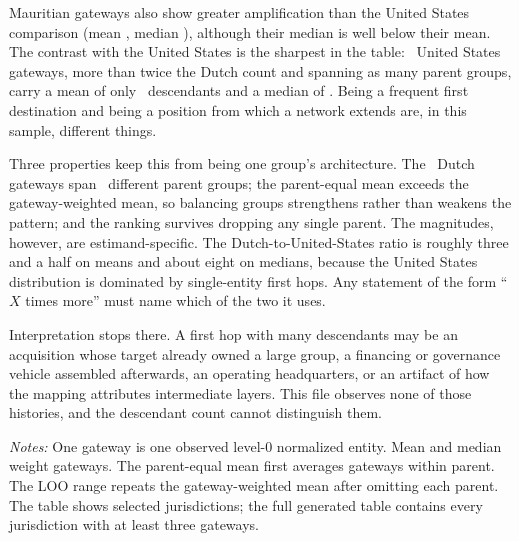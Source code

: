 \documentclass[11pt]{article}
\begin{document}
Mauritian gateways also show greater amplification than the United States
comparison (mean \MauritiusGatewayMean, median \MauritiusGatewayMedian),
although their median is well below their mean. The contrast with the United
States is the sharpest in the table: \UsGateways\ United States gateways, more
than twice the Dutch count and spanning as many parent groups, carry a mean of
only \DutchGatewayUsMean\ descendants and a median of \UsGatewayMedian. Being a
frequent first destination and being a position from which a network extends
are, in this sample, different things.

Three properties keep this from being one group's architecture. The
\DutchGateways\ Dutch gateways span \DutchGatewayParents\ different parent
groups; the parent-equal mean exceeds the gateway-weighted mean, so balancing
groups strengthens rather than weakens the pattern; and the ranking survives
dropping any single parent. The magnitudes, however, are estimand-specific. The
Dutch-to-United-States ratio is roughly three and a half on means and about
eight on medians, because the United States distribution is dominated by
single-entity first hops. Any statement of the form ``$X$ times more'' must name
which of the two it uses.

Interpretation stops there. A first hop with many descendants may be an
acquisition whose target already owned a large group, a financing or governance
vehicle assembled afterwards, an operating headquarters, or an artifact of how
the mapping attributes intermediate layers. This file observes none of those
histories, and the descendant count cannot distinguish them.

\begin{table}[tbp]
\centering
\caption{Downstream amplification by selected first-hop jurisdiction}
\label{tab:gateways}
\scriptsize
\resizebox{\textwidth}{!}{}
\begin{minipage}{0.97\textwidth}
\footnotesize\vspace{0.4em}
\textit{Notes:} One gateway is one observed level-0 normalized entity. Mean
and median weight gateways. The parent-equal mean first averages gateways
within parent. The LOO range repeats the gateway-weighted mean after omitting
each parent. The table shows selected jurisdictions; the full generated table
contains every jurisdiction with at least three gateways.
\end{minipage}
\end{table}
\end{document}
